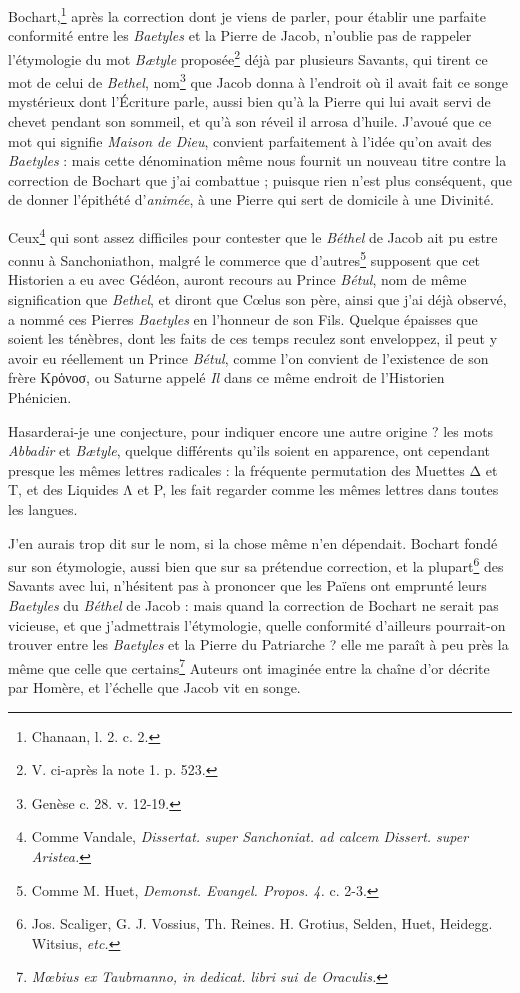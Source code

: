 \documentclass[a4paper, 11pt, oneside, polutonikogreek, french]{article}
\begin{document}
Bochart,\footnote{Chanaan, l. 2. c. 2.} après la correction dont je viens de parler, pour établir une parfaite conformité entre les \emph{Baetyles} et la Pierre de Jacob, n'oublie pas de rappeler l'étymologie du mot \emph{Bætyle} proposée\footnote{V. ci-après la note 1. p. 523.} déjà par plusieurs Savants, qui tirent ce mot de celui de \emph{Bethel}, nom\footnote{Genèse c. 28. v. 12-19.} que Jacob donna à l'endroit où il avait fait ce songe mystérieux dont l'Écriture parle, aussi bien qu'à la Pierre qui lui avait servi de chevet pendant son sommeil, et qu'à son réveil il arrosa d'huile. J'avoué que ce mot qui signifie \emph{Maison de Dieu}, convient parfaitement à l'idée qu'on avait des \emph{Baetyles} : mais cette dénomination même nous fournit un nouveau titre contre la correction de Bochart que j'ai combattue ; puisque rien n'est plus conséquent, que de donner l'épithété d'\emph{animée}, à une Pierre qui sert de domicile à une Divinité.

Ceux\footnote{Comme Vandale, \emph{Dissertat. super Sanchoniat. ad calcem Dissert. super Aristea.}} qui sont assez difficiles pour contester que le \emph{Béthel} de Jacob ait pu estre connu à Sanchoniathon, malgré le commerce que d'autres\footnote{Comme M. Huet, \emph{Demonst. Evangel. Propos. 4.} c. 2-3.} supposent que cet Historien a eu avec Gédéon, auront recours au Prince \emph{Bétul}, nom de même signification que \emph{Bethel}, et diront que Cœlus son père, ainsi que j'ai déjà observé, a nommé ces Pierres \emph{Baetyles} en l'honneur de son Fils. Quelque épaisses que soient les ténèbres, dont les faits de ces temps reculez sont enveloppez, il peut y avoir eu réellement un Prince \emph{Bétul}, comme l'on convient de l'existence de son frère Κρὁνοσ, ou Saturne appelé \emph{Il} dans ce même endroit de l'Historien Phénicien.

Hasarderai-je une conjecture, pour indiquer encore une autre origine ? les mots \emph{Abbadir} et \emph{Bætyle}, quelque différents qu'ils soient en apparence, ont cependant presque les mêmes lettres radicales : la fréquente permutation des Muettes Δ et T, et des Liquides Λ et P, les fait regarder comme les mêmes lettres dans toutes les langues.

J'en aurais trop dit sur le nom, si la chose même n'en dépendait. Bochart fondé sur son étymologie, aussi bien que sur sa prétendue correction, et la plupart\footnote{Jos. Scaliger, G. J. Vossius, Th. Reines. H. Grotius, Selden, Huet, Heidegg. Witsius, \emph{etc.}} des Savants avec lui, n'hésitent pas à prononcer que les Païens ont emprunté leurs \emph{Baetyles} du \emph{Béthel} de Jacob : mais quand la correction de Bochart ne serait pas vicieuse, et que j'admettrais l'étymologie, quelle conformité d'ailleurs pourrait-on trouver entre les \emph{Baetyles} et la Pierre du Patriarche ? elle me paraît à peu près la même que celle que certains\footnote{\emph{Mœbius ex Taubmanno, in dedicat. libri sui de Oraculis.}} Auteurs ont imaginée entre la chaîne d'or décrite par Homère, et l'échelle que Jacob vit en songe. 
\end{document}
